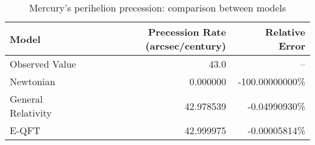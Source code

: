 \begin{table}[ht]
    \centering
    \begin{tabular}{lrr}
        \toprule
        Model & Precession Rate (arcsec/century) & Relative Error \\
        \midrule
        Observed Value & 43.0 & -- \\
        Newtonian & 0.000000 & -100.00000000\% \\
        General Relativity & 42.978539 & -0.04990930\% \\
        E-QFT & 42.999975 & -0.00005814\% \\
        \bottomrule
    \end{tabular}
    \caption{Mercury's perihelion precession: comparison between models}
    \label{tab:mercury_precession}
\end{table}